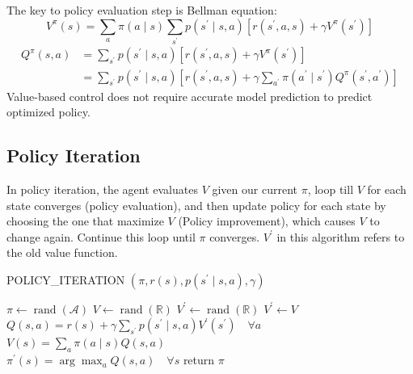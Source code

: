\documentclass[11pt]{article}
\begin{document}
The key to policy evaluation step is Bellman equation:
\begin{equation}
V^{\pi}(s)=\sum_{a} \pi(a \mid s) \sum_{s^{\prime}} p\left(s^{\prime} \mid s, a\right)\left[r\left(s^{\prime}, a, s\right)+\gamma V^{\pi}\left(s^{\prime}\right)\right]
\end{equation}
\begin{equation}
\begin{split}
Q^{\pi}(s, a) &= \sum_{s^{\prime}} p\left(s^{\prime} \mid s, a\right) \left[r\left(s^{\prime}, a, s\right) + \gamma V^{\pi}\left(s^{\prime}\right) \right] \\
&= \sum_{s^{\prime}} p\left(s^{\prime} \mid s, a\right) \left[r\left(s^{\prime}, a, s\right) + \gamma \sum_{a^{\prime}} \pi\left(a^{\prime} \mid s^{\prime}\right) Q^{\pi}\left(s^{\prime}, a^{\prime}\right) \right]
\end{split}
\end{equation}
Value-based control does not require accurate model prediction to predict optimized policy.

\subsection{Policy Iteration}
In policy iteration, the agent evaluates $V$ given our current $\pi$, loop till $V$ for each state converges (policy evaluation), and then update policy for each state by choosing the one that maximize $V$ (Policy improvement), which causes $V$ to change again. Continue this loop until $\pi$ converges. $V^\prime$ in this algorithm refers to the old value function.

\begin{algorithm}[H]
\caption{POLICY\_ITERATION $\left(\pi, r(s), p\left(s^{\prime} \mid s, a\right), \gamma\right)$}
\label{algo:wma}
\begin{algorithmic}[1]
\State $\pi \leftarrow \operatorname{rand}(\mathcal{A})$
\State $V \leftarrow \operatorname{rand}(\mathbb{R})$
\State $V^{\prime} \leftarrow \operatorname{rand}(\mathbb{R})$
\While {$\pi^{\prime} \neq \pi$}
        \State $V^{\prime} \leftarrow V$
            \State $Q(s, a)=r(s)+\gamma \sum_{s^{\prime}} p\left(s^{\prime} \mid s, a\right) V^{\prime}\left(s^{\prime}\right) \quad \forall a $
            \State $V(s)=\sum_{a} \pi(a \mid s) Q(s, a)$
        \EndFor
    \EndWhile \\
    
    \State $\pi^{\prime}(s)=\arg \max _{a} Q(s, a) \quad \forall s$
\EndWhile
\State return $\pi$
\end{algorithmic}
\end{algorithm}
\end{document}
